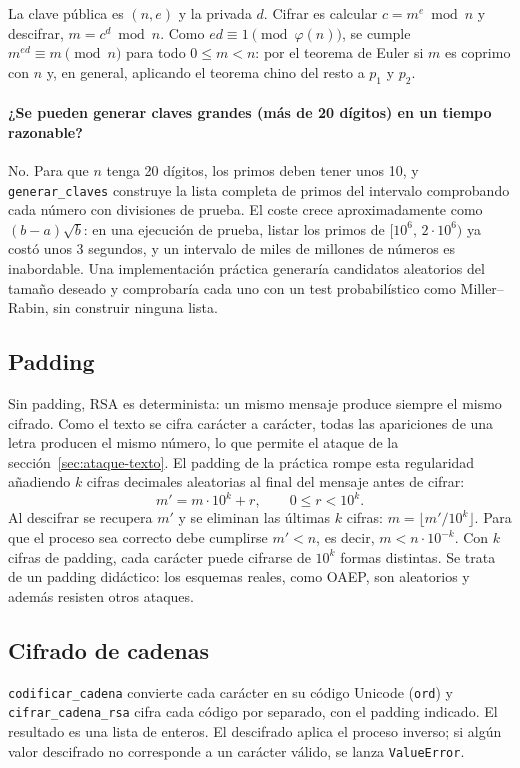 \documentclass[11pt,a4paper]{article}
\newcommand{\code}[1]{\texttt{#1}}
\begin{document}
La clave pública es $(n,e)$ y la privada $d$. Cifrar es calcular $c=m^e \bmod n$ y descifrar, $m=c^d \bmod n$. Como $ed\equiv1 \pmod{\varphi(n)}$, se cumple $m^{ed}\equiv m \pmod n$ para todo $0\le m<n$: por el teorema de Euler si $m$ es coprimo con $n$ y, en general, aplicando el teorema chino del resto a $p_1$ y $p_2$.

\paragraph{¿Se pueden generar claves grandes (más de 20 dígitos) en un tiempo razonable?}
No. Para que $n$ tenga 20 dígitos, los primos deben tener unos 10, y \code{generar\_claves} construye la lista completa de primos del intervalo comprobando cada número con divisiones de prueba. El coste crece aproximadamente como $(b-a)\sqrt{b}$: en una ejecución de prueba, listar los primos de $[10^6,\,2\cdot10^6)$ ya costó unos 3 segundos, y un intervalo de miles de millones de números es inabordable. Una implementación práctica generaría candidatos aleatorios del tamaño deseado y comprobaría cada uno con un test probabilístico como Miller--Rabin, sin construir ninguna lista.

\subsection{Padding}

Sin padding, RSA es determinista: un mismo mensaje produce siempre el mismo cifrado. Como el texto se cifra carácter a carácter, todas las apariciones de una letra producen el mismo número, lo que permite el ataque de la sección~\ref{sec:ataque-texto}. El padding de la práctica rompe esta regularidad añadiendo $k$ cifras decimales aleatorias al final del mensaje antes de cifrar:
\[
m' = m\cdot10^{k}+r,\qquad 0\le r<10^{k}.
\]
Al descifrar se recupera $m'$ y se eliminan las últimas $k$ cifras: $m=\lfloor m'/10^{k}\rfloor$. Para que el proceso sea correcto debe cumplirse $m'<n$, es decir, $m<n\cdot10^{-k}$. Con $k$ cifras de padding, cada carácter puede cifrarse de $10^k$ formas distintas. Se trata de un padding didáctico: los esquemas reales, como OAEP, son aleatorios y además resisten otros ataques.

\subsection{Cifrado de cadenas}

\code{codificar\_cadena} convierte cada carácter en su código Unicode (\code{ord}) y \code{cifrar\_cadena\_rsa} cifra cada código por separado, con el padding indicado. El resultado es una lista de enteros. El descifrado aplica el proceso inverso; si algún valor descifrado no corresponde a un carácter válido, se lanza \code{ValueError}.
\end{document}
